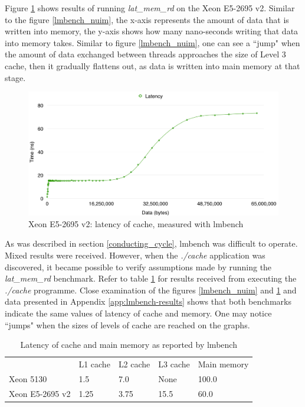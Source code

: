 Figure \ref{lmbench_ichec} shows results of running \textit{lat\_mem\_rd} on the Xeon E5-2695 v2. Similar to the figure \ref{lmbench_nuim}, the x-axis represents the amount of data that is written into memory, the y-axis shows how many nano-seconds writing that data into memory takes. Similar to figure \ref{lmbench_nuim}, one can see a ``jump" when the amount of data exchanged between threads approaches the size of Level 3 cache, then it gradually flattens out, as data is written into main memory at that stage. 

\begin{figure}[!htb]
\centering
\includegraphics[width=145mm]{6/lmbench_ichec.png}
\caption{Xeon E5-2695 v2: latency of cache, measured with lmbench}
\label{lmbench_ichec}
\end{figure}

As was described in section \ref{conducting_cycle}, lmbench was difficult to operate. Mixed results were received. However, when the \textit{./cache} application was discovered, it became possible to verify assumptions made by running the \textit{lat\_mem\_rd} benchmark. Refer to table \ref{lmbenchTable} for results received from executing the \textit{./cache} programme. Close examination of the figures \ref{lmbench_nuim} and \ref{lmbench_ichec} and data presented in Appendix \ref{app:lmbench-results} shows that both benchmarks indicate the same values of latency of cache and memory. One may notice ``jumps" when the sizes of levels of cache are reached on the graphs.

\begin{table}
\caption{Latency of cache and main memory as reported by lmbench}
\centering 
\begin{tabular}{lllll}
             & L1 cache & L2 cache & L3 cache & Main memory \\
Xeon 5130  & 1.5      & 7.0      & None     & 100.0         \\
Xeon E5-2695 v2 & 1.25     & 3.75     & 15.5     & 60.0       
\end{tabular}
\label{lmbenchTable}
\end{table}

